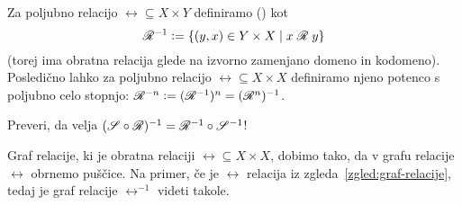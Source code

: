                Za poljubno relacijo $\rel \subseteq X \times Y$ definiramo  ()  kot
                \[\rel^{-1} \dfeq \set{(y, x) \in Y \times X}{\rel[x][y]}\]
                (torej ima obratna relacija glede na izvorno zamenjano domeno in kodomeno). Posledično lahko za poljubno relacijo $\rel \subseteq X \times X$ definiramo njeno potenco s poljubno celo stopnjo: $\rel^{-n} \dfeq (\rel^{-1})^n = (\rel^n)^{-1}$.

                \begin{vaja}
                        Preveri, da velja $(\srel \circ \rel)^{-1} = \rel^{-1} \circ \srel^{-1}$!
                \end{vaja}

                \begin{zgled}
                        Graf relacije, ki je obratna relaciji $\rel \subseteq X \times X$, dobimo tako, da v grafu relacije $\rel$ obrnemo puščice. Na primer, če je $\rel$ relacija iz zgleda~\ref{zgled:graf-relacije}, tedaj je graf relacije $\rel^{-1}$ videti takole.

                \end{zgled}

